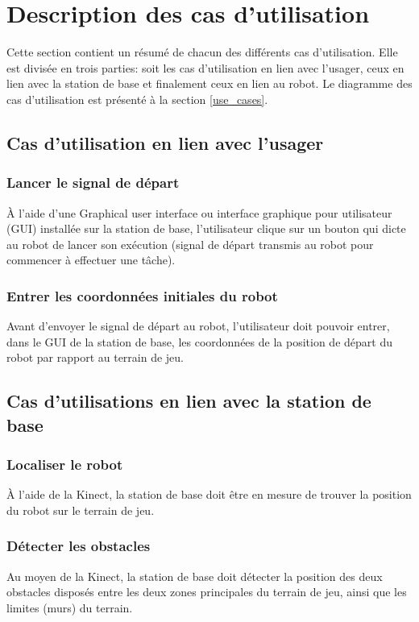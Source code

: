 


\chapter{Description des cas d'utilisation}
\label{s:utilisation}
Cette section contient un résumé de chacun des différents cas d'utilisation. Elle est divisée en trois parties: soit les cas d'utilisation en lien avec l'usager, ceux en lien avec la station de base et finalement ceux en lien au robot. Le diagramme des cas d'utilisation est présenté à la section \ref{use_cases}.
\section{Cas d'utilisation en lien avec l'usager}
\subsection{Lancer le signal de départ}
À l'aide d'une Graphical user interface ou interface graphique pour utilisateur (GUI) installée sur la station de base, l'utilisateur clique sur un bouton qui dicte au robot de lancer son exécution (signal de départ transmis au robot pour commencer à effectuer une tâche).
\subsection{Entrer les coordonnées initiales du robot}
Avant d'envoyer le signal de départ au robot, l'utilisateur doit pouvoir entrer, dans le GUI de la station de base, les coordonnées de la position de départ du robot par rapport au terrain de jeu.
\section{Cas d'utilisations en lien avec la station de base}
\subsection{Localiser le robot}
À l'aide de la Kinect, la station de base doit être en mesure de trouver la position du robot sur le terrain de jeu.
\subsection{Détecter les obstacles}
Au moyen de la Kinect, la station de base doit détecter la position des deux obstacles disposés entre les deux zones principales du terrain de jeu, ainsi que les limites (murs) du terrain.
